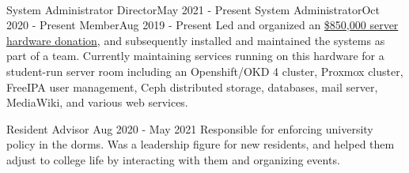 \vspace{1.5pt} %


\cvtag{\LaTeX}
\medskip
\\

\vspace{6pt} %

    {System Administrator Director}{May 2021 - Present}
    {System Administrator}{Oct 2020 - Present}
    {Member}{Aug 2019 - Present}
    {Led and organized an \href{https://www.rit.edu/news/wayfair-gifts-850000-servers-rits-computer-science-house}{\$850,000 server hardware donation}, and subsequently installed and maintained the systems as part of a team. Currently maintaining services running on this hardware for a student-run server room including an Openshift/OKD 4 cluster, Proxmox cluster, FreeIPA user management, Ceph distributed storage, databases, mail server, MediaWiki, and various web services.} 

    {Resident Advisor} {Aug 2020 - May 2021}
    {Responsible for enforcing university policy in the dorms. Was a leadership figure for new residents, and helped them adjust to college life by interacting with them and organizing events.}